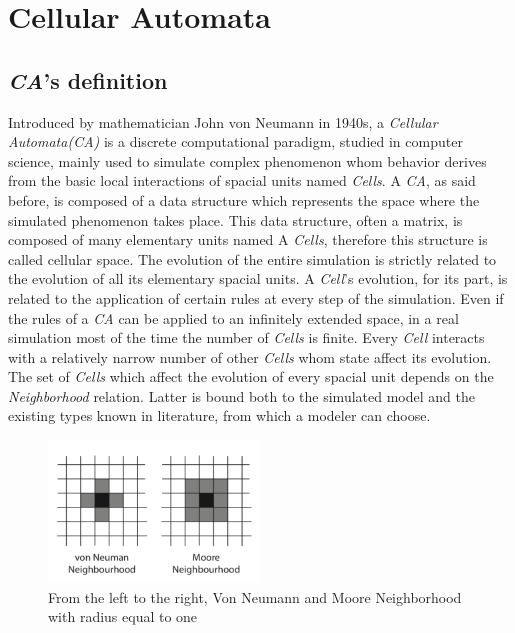 \documentclass[12pt,a4paper,fleqn]{report}
\begin{document}
\chapter{Cellular Automata}
\section{\textit{CA}'s definition}
Introduced by mathematician John von Neumann in 1940s, a \textit{Cellular Automata(CA)} is a discrete computational paradigm, studied in computer science, mainly used to simulate complex phenomenon whom behavior derives from the basic local interactions of spacial units named \textit{Cells}. A \textit{CA}, as said before, is composed of a  data structure which represents the space where the simulated phenomenon takes place. This data structure, often a matrix, is composed of many elementary units named A \textit{Cells}, therefore this structure is called cellular space. The evolution of the entire simulation is strictly related to the evolution of  all its elementary spacial units. A \textit{Cell}'s evolution, for its part, is related to the application of certain rules at every step of the simulation. Even if the rules of a \textit{CA} can be applied to an infinitely extended space, in a real simulation most of the time the number of \textit{Cells} is finite. Every \textit{Cell} interacts with a relatively narrow number of other \textit{Cells} whom state affect its evolution. The set of \textit{Cells} which affect the evolution of every spacial unit depends on the \textit{Neighborhood} relation. Latter is bound both to the simulated model and the existing types known in literature, from which a modeler can choose. \\

\begin{figure}[ht!]
\centering
    \includegraphics[width=0.5\textwidth]{neigh_types}
    \caption{  From the left to the right, Von Neumann and Moore Neighborhood  with radius equal to one \cite{1} }
\end{figure}
\end{document}
